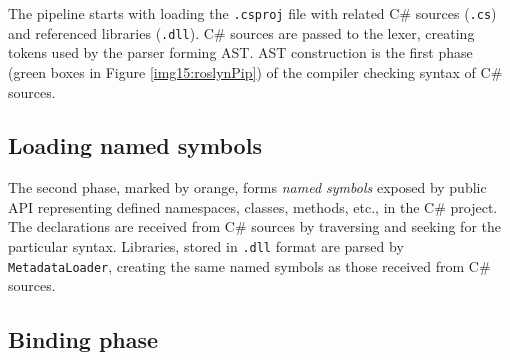 The pipeline starts with loading the \texttt{.csproj} file with related C\# sources (\texttt{.cs}) and referenced libraries (\texttt{.dll}).
C\# sources are passed to the lexer, creating tokens used by the parser forming \ac{AST}.
\ac{AST} construction is the first phase (green boxes in Figure \ref{img15:roslynPip}) of the compiler checking syntax of C\# sources.

\subsection{Loading named symbols}

The second phase, marked by orange, forms \emph{named symbols} exposed by public API representing defined namespaces, classes, methods, etc., in the C\# project. 
The declarations are received from C\# sources by traversing  and seeking for the particular syntax. 
Libraries, stored in \texttt{.dll} format are parsed by \texttt{MetadataLoader}, creating the same named symbols as those received from C\# sources.

\subsection{Binding phase}

